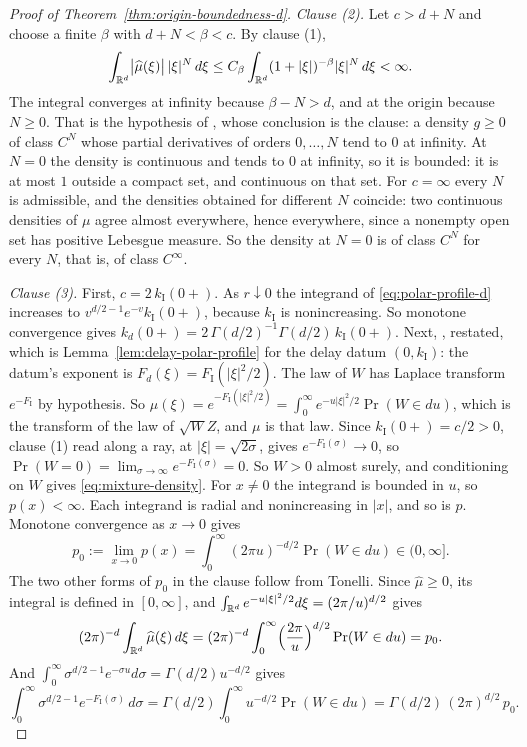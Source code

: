 \begin{proof}[Proof of Theorem~\ref{thm:origin-boundedness-d}]
\emph{Clause (2).} Let $c > d+N$ and choose a finite $\beta$ with $d + N < \beta < c$. By clause
(1),
\[
  \int_{\mathbb{R}^d}\bigl|\widehat\mu(\xi)\bigr|\,|\xi|^N\,d\xi
   \le C_\beta\int_{\mathbb{R}^d}(1+|\xi|)^{-\beta}|\xi|^N\,d\xi < \infty .
\]
The integral converges at infinity because $\beta - N > d$, and at the origin because $N \ge 0$.
That is the hypothesis of , whose conclusion is the clause: a density $g \ge 0$ of
class $C^N$ whose partial derivatives of orders $0,\dots,N$ tend to $0$ at infinity.
At $N = 0$ the density is continuous and tends to $0$ at infinity, so it is bounded: it is at most
$1$ outside a compact set, and continuous on that set. For $c = \infty$ every $N$ is admissible,
and the densities obtained for different $N$ coincide: two continuous densities of $\mu$ agree
almost everywhere, hence everywhere, since a nonempty open set has positive Lebesgue measure. So the
density at $N = 0$ is of class $C^N$ for every $N$, that is, of class $C^\infty$.

\emph{Clause (3).} First, $c = 2\,k_{\mathrm I}(0{+})$. As $r \downarrow 0$ the integrand of
\ref{eq:polar-profile-d} increases to $v^{d/2-1}e^{-v}k_{\mathrm I}(0{+})$, because $k_{\mathrm I}$
is nonincreasing. So monotone convergence gives
$k_d(0{+}) = 2\,\Gamma(d/2)^{-1}\Gamma(d/2)\,k_{\mathrm I}(0{+})$. Next, ,
restated, which is Lemma~\ref{lem:delay-polar-profile} for the delay datum $(0,k_{\mathrm I})$: the datum's exponent is $F_d(\xi) = F_{\mathrm I}(|\xi|^2/2)$. The law of $W$ has Laplace
transform $e^{-F_{\mathrm I}}$ by hypothesis. So
$\widehat\mu(\xi) = e^{-F_{\mathrm I}(|\xi|^2/2)} = \int_0^\infty e^{-u|\xi|^2/2}\Pr(W \in du)$,
which is the transform of the law of $\sqrt{W}Z$, and $\mu$ is that law. Since
$k_{\mathrm I}(0{+}) = c/2 > 0$, clause (1) read along a ray, at $|\xi| = \sqrt{2\sigma}$, gives
$e^{-F_{\mathrm I}(\sigma)} \to 0$, so
$\Pr(W = 0) = \lim_{\sigma\to\infty}e^{-F_{\mathrm I}(\sigma)} = 0$. So $W > 0$ almost surely,
and conditioning on $W$ gives \ref{eq:mixture-density}. For $x \ne 0$ the integrand is bounded in
$u$, so $p(x) < \infty$. Each integrand is radial and nonincreasing in $|x|$, and so is $p$.
Monotone convergence as $x \to 0$ gives
\[
  p_0 := \lim_{x\to0}p(x) = \int_0^\infty (2\pi u)^{-d/2}\Pr(W \in du) \in (0,\infty] .
\]
The two other forms of $p_0$ in the clause follow from Tonelli. Since $\widehat\mu \ge 0$, its
integral is defined in $[0,\infty]$, and $\int_{\mathbb{R}^d}e^{-u|\xi|^2/2}d\xi = (2\pi/u)^{d/2}$ gives
\[
  (2\pi)^{-d}\int_{\mathbb{R}^d}\widehat\mu(\xi)\,d\xi
   = (2\pi)^{-d}\int_0^\infty\Bigl(\frac{2\pi}{u}\Bigr)^{d/2}\Pr(W \in du) = p_0 .
\]
And $\int_0^\infty\sigma^{d/2-1}e^{-\sigma u}d\sigma = \Gamma(d/2)u^{-d/2}$ gives
\[
  \int_0^\infty\sigma^{d/2-1}e^{-F_{\mathrm I}(\sigma)}\,d\sigma
   = \Gamma(d/2)\int_0^\infty u^{-d/2}\Pr(W \in du) = \Gamma(d/2)\,(2\pi)^{d/2}\,p_0 .
\]


\end{proof}

